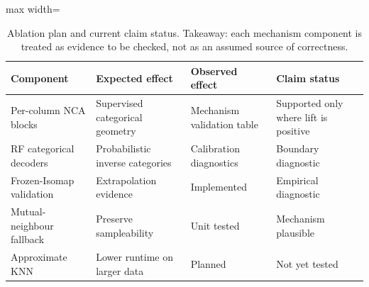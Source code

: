 \begin{table}
\caption{Ablation plan and current claim status. Takeaway: each mechanism component is treated as evidence to be checked, not as an assumed source of correctness.}
\label{tab:ablations}
\begin{adjustbox}{max width=\columnwidth}
\begin{tabular}{llll}
\toprule
Component & Expected effect & Observed effect & Claim status \\
\midrule
Per-column NCA blocks & Supervised categorical geometry & Mechanism validation table & Supported only where lift is positive \\
RF categorical decoders & Probabilistic inverse categories & Calibration diagnostics & Boundary diagnostic \\
Frozen-Isomap validation & Extrapolation evidence & Implemented & Empirical diagnostic \\
Mutual-neighbour fallback & Preserve sampleability & Unit tested & Mechanism plausible \\
Approximate KNN & Lower runtime on larger data & Planned & Not yet tested \\
\bottomrule
\end{tabular}
\end{adjustbox}
\end{table}

